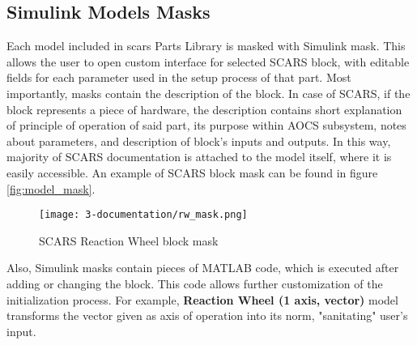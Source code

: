 


    \subsection{Simulink Models Masks}
        Each model included in \ac{scars} Parts Library is masked with Simulink mask\cite{masks}. This allows the user to open custom interface for selected SCARS block, with editable fields for each parameter used in the setup process of that part. Most importantly, masks contain the description of the block. In case of SCARS, if the block represents a piece of hardware, the description contains short explanation of principle of operation of said part, its purpose within AOCS subsystem, notes about parameters, and description of block's inputs and outputs. In this way, majority of SCARS documentation is attached to the model itself, where it is easily accessible. An example of SCARS block mask can be found in figure \autoref{fig:model_mask}.
        
        \begin{figure}[H]
            \centering
            \texttt{[image: 3-documentation/rw\_mask.png]}
            \caption{SCARS Reaction Wheel block mask}
            \label{fig:model_mask}
        \end{figure}
        
        Also, Simulink masks contain pieces of MATLAB code, which is executed after adding or changing the block. This code allows further customization of the initialization process. For example, \textbf{Reaction Wheel (1 axis, vector)} model transforms the vector given as axis of operation into its norm, "sanitating" user's input. 
